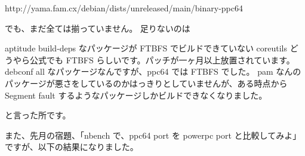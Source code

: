 \documentclass[mingoth,a4paper]{jsarticle}
\begin{document}
\begin{commandline}
http://yama.fam.cx/debian/dists/unreleased/main/binary-ppc64
\end{commandline}

でも、まだ全ては揃っていません。
足りないのは

\begin{commandline}
aptitude    build-deps なパッケージが FTBFS でビルドできていない
coreutils   どうやら公式でも FTBFS らしいです。パッチが一ヶ月以上放置されています。
debconf     all なパッケージなんですが、ppc64 では FTBFS でした。
pam         なんのパッケージが悪さをしているのかはっきりとしていませんが、ある時点から Segment fault するようなパッケージしかビルドできなくなりました。
\end{commandline}

と言った所です。

また、先月の宿題、「nbench で、ppc64 port を powerpc port と比較してみよ」ですが、以下の結果になりました。
\end{document}
